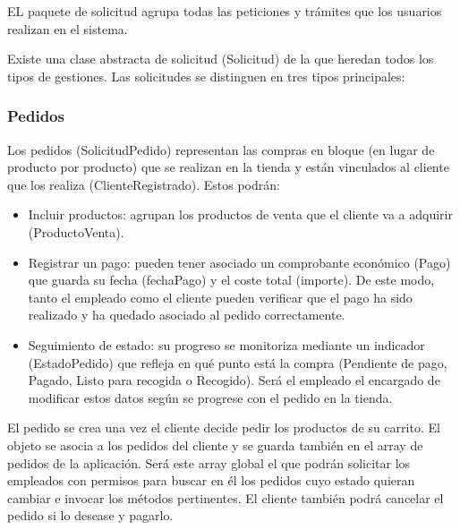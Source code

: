 \documentclass{article}
\begin{document}
EL paquete de solicitud agrupa todas las peticiones y trámites que los usuarios realizan en el sistema.

Existe una clase abstracta de solicitud (Solicitud) de la que heredan todos los tipos de gestiones.
Las solicitudes se distinguen en tres tipos principales:

\subsubsection{Pedidos}
Los pedidos (SolicitudPedido) representan las compras en bloque (en lugar de producto por producto) que se realizan en la tienda y están vinculados al cliente que los realiza (ClienteRegistrado). Estos podrán:
\begin{itemize}
  \item Incluir productos: agrupan los productos de venta que el cliente va a adquirir (ProductoVenta).
  \item Registrar un pago: pueden tener asociado un comprobante económico (Pago) que guarda su fecha (fechaPago) y el coste total (importe). De este modo, tanto el empleado como el cliente pueden verificar que el pago 
ha sido realizado y ha quedado asociado al pedido correctamente.
\item Seguimiento de estado: su progreso se monitoriza mediante un indicador (EstadoPedido) que refleja en qué punto está la compra (Pendiente de pago, Pagado, Listo para recogida o Recogido). Será el empleado el encargado de modificar estos datos según se progrese con el pedido en la tienda.
\end{itemize}
El pedido se crea una vez el cliente decide pedir los productos de su carrito. El objeto se asocia a los pedidos del cliente y se guarda también en el array de pedidos de la aplicación. Será este array global el que podrán solicitar los empleados con permisos para buscar en él los pedidos cuyo estado quieran cambiar e invocar los métodos pertinentes. El cliente también podrá cancelar el pedido si lo desease y pagarlo.
\end{document}
